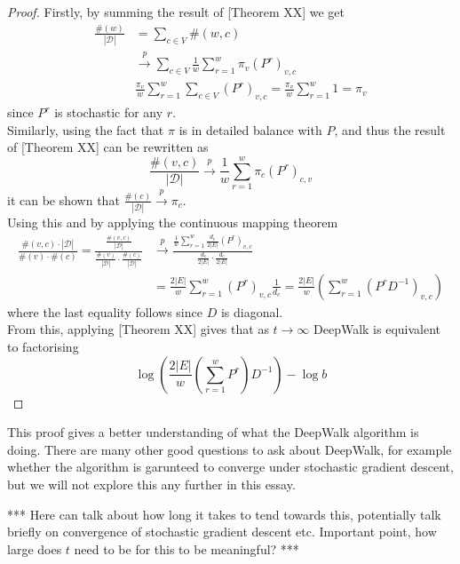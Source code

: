 \documentclass[a4paper]{article}
\newcommand{\D}{\mathcal D}
\begin{document}
\begin{proof}
  Firstly, by summing the result of [Theorem XX] we get
  \begin{align*}
    \frac{\#(w)}{|\D|} &= \sum_{c \in V}\#(w, c)\\
                       &\overset{p}{\to} \sum_{c \in V} \frac{1}{w}\sum_{r=1}^w \pi_v(P^r)_{v, c}\\
                       &\frac{\pi_v}{w}\sum_{r = 1}^w \sum_{c \in V}(P^r)_{v,c} = \frac{\pi_v}{w}\sum_{r = 1}^w 1 = \pi_v
  \end{align*}
  since $P^r$ is stochastic for any $r$.\\
  Similarly, using the fact that $\pi$ is in detailed balance with $P$, and thus
  the result of [Theorem XX] can be rewritten as
  \[\frac{\#(v, c)}{|\D|} \overset{p}{\to} \frac{1}{w} \sum_{r = 1}^w \pi_c
    (P^r)_{c,v}\]
  it can be shown that $\frac{\#(c)}{|\D|} \overset{p}{\to} \pi_c$.\\
  Using this and by applying the continuous mapping theorem
  \begin{align*}
    \frac{\#(v, c) \cdot |\D|}{\#(v) \cdot \#(c)} = \frac{\frac{\#(v,c)}{|\D|}}{\frac{\#(v)}{|\D|} \cdot \frac{\#(c)}{|\D|}} & \overset{p}{\to} \frac{\frac{1}{w}\sum_{r=1}^{w} \frac{d_v}{2|E|}(P^r)_{v, c}}{\frac{d_v}{2|E|} \cdot \frac{d_c}{2|E|}}\\
                                                                                                                             &=\frac{2|E|}{w}\sum_{r=1}^w (P^r)_{v,c} \frac{1}{d_c} = \frac{2|E|}{w}\left( \sum_{r=1}^w(P^rD^{-1})_{v,c} \right)
  \end{align*}
  where the last equality follows since $D$ is diagonal.\\

  From this, applying [Theorem XX] gives that as $t \to \infty$ DeepWalk is equivalent to
  factorising
  \[\log \left( \frac{2|E|}{w}\left( \sum_{r=1}^w P^r \right)D^{-1}\right) - \log{b}\]
\end{proof}

This proof gives a better understanding of what the DeepWalk algorithm is doing.
There are many other good questions to ask about DeepWalk, for example whether
the algorithm is garunteed to converge under stochastic gradient descent, but we
will not explore this any further in this essay.

*** Here can talk about how long it takes to tend towards this, potentially talk
briefly on convergence of stochastic gradient descent etc. Important point, how
large does $t$ need to be for this to be meaningful? ***
\end{document}
